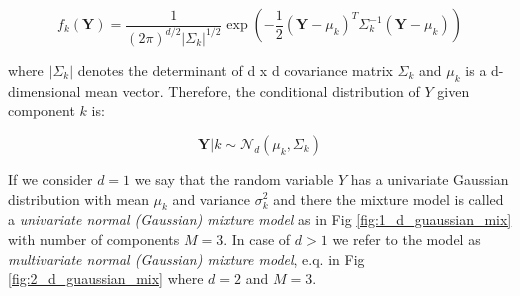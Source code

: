 \begin{equation}
    f_k(\textbf{Y}) = \frac{1}{{(2\pi)}^{d/2}|\Sigma_k|^{1/2}} \exp\left(-\frac{1}{2}{(\textbf{Y}-\mu_k)}^T\Sigma_k^{-1}(\textbf{Y}-\mu_k)\right)
\end{equation}

where $|\Sigma_k|$ denotes the determinant of d x d covariance matrix $\Sigma_k$ and $\mu_k$ is a d-dimensional mean vector. Therefore, the conditional distribution of $Y$ given component $k$ is:

\begin{equation}
    \textbf{Y}|k \sim \mathcal{N}_d(\mu_k,\Sigma_k)
\end{equation}

If we consider $d=1$ we say that the random variable $Y$ has a univariate Gaussian distribution with mean $\mu_k$ and variance $\sigma_k^2$ and there the 
mixture model is called a \textit{univariate normal (Gaussian) mixture model} as in Fig \ref{fig:1_d_guaussian_mix} with number of components $M=3$. In case of $d>1$ we refer to the model as \textit{multivariate normal (Gaussian) mixture model}, e.q. in Fig \ref{fig:2_d_guaussian_mix} 
where $d=2$ and $M=3$.

